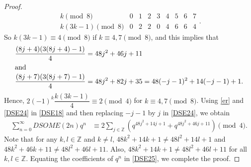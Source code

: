 \documentclass[12pt]{article}
\numberwithin{equation}{section}
\theoremstyle{definition}
\theoremstyle{remark}
\numberwithin{equation}{section}
\begin{document}
\begin{proof}
$$\begin{array}{c|cccccccc}
k\pmod8&0&1&2&3&4&5&6&7\\ \hline
k(3k-1)\pmod8&0&2&2&0&4&6&6&4
\end{array}.$$
So  $k(3k-1)\equiv4\pmod8$ if  $k\equiv4,7\pmod8$, and this implies that
\begin{align}\label{er}
\dfrac{(8j+4)(3(8j+4)-1)}{4}
&=
48j^2+46j+11\\\intertext{and}
\dfrac{(8j+7)(3(8j+7)-1)}{4}
&\label{DSE24}=
48j^2+82j+35
=
48(-j-1)^2+14(-j-1)+1.
\end{align}
Hence, $2(-1)^k\dfrac{k(3k-1)}{4}\equiv 2\pmod 4$ for $k\equiv4,7\pmod8$.
Using \eqref{er} and \eqref{DSE24} in \eqref{DSE18} and  then replacing $-j-1$
by $j$ in \eqref{DSE24}, we obtain
\begin{align}
\sum_{n=0}^{\infty}DSOME(2n)q^n
&\label{DSE25}\equiv
2\sum_{j\in\mathbb Z}
\left(
q^{48j^2+14j+1}
+
q^{48j^2+46j+11}
\right)
\pmod4.
\end{align}
Note that for any $k, l\in\mathbb Z$ and $k\ne l$, $48k^2+14k+1\ne 48l^2+14l+1$ and $48k^2+46k+11\ne 48l^2+46l+11$.  Also,   $48k^2+14k+1\ne 48l^2+46l+11$ for all $k,l\in\mathbb Z$.  Equating  the coefficients of $q^n$ in  \eqref{DSE25}, we complete the proof. 
\end{proof}
\end{document}
